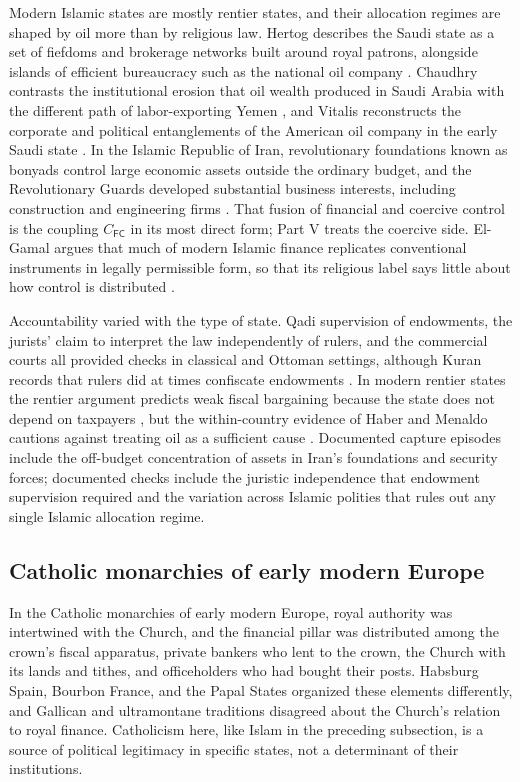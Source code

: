 \documentclass[11pt,letterpaper]{article}
\theoremstyle{definition}
\theoremstyle{remark}
\newcommand{\pF}{\mathsf{F}}
\newcommand{\pC}{\mathsf{C}}
\begin{document}
Modern Islamic states are mostly rentier states, and their allocation regimes are shaped by oil more than by religious law. Hertog describes the Saudi state as a set of fiefdoms and brokerage networks built around royal patrons, alongside islands of efficient bureaucracy such as the national oil company \citep{hertog2010}. Chaudhry contrasts the institutional erosion that oil wealth produced in Saudi Arabia with the different path of labor-exporting Yemen \citep{chaudhry1997}, and Vitalis reconstructs the corporate and political entanglements of the American oil company in the early Saudi state \citep{vitalis2007}. In the Islamic Republic of Iran, revolutionary foundations known as bonyads control large economic assets outside the ordinary budget, and the Revolutionary Guards developed substantial business interests, including construction and engineering firms \citep{maloney2015,wehrey2009}. That fusion of financial and coercive control is the coupling $C_{\pF\pC}$ in its most direct form; Part V treats the coercive side. El-Gamal argues that much of modern Islamic finance replicates conventional instruments in legally permissible form, so that its religious label says little about how control is distributed \citep{elgamal2006}.

Accountability varied with the type of state. Qadi supervision of endowments, the jurists' claim to interpret the law independently of rulers, and the commercial courts all provided checks in classical and Ottoman settings, although Kuran records that rulers did at times confiscate endowments \citep{kuran2001}. In modern rentier states the rentier argument predicts weak fiscal bargaining because the state does not depend on taxpayers \citep{beblawiluciani1987,ross2001}, but the within-country evidence of Haber and Menaldo cautions against treating oil as a sufficient cause \citep{habermenaldo2011}. Documented capture episodes include the off-budget concentration of assets in Iran's foundations and security forces; documented checks include the juristic independence that endowment supervision required and the variation across Islamic polities that rules out any single Islamic allocation regime.

\subsection{Catholic monarchies of early modern Europe}

In the Catholic monarchies of early modern Europe, royal authority was intertwined with the Church, and the financial pillar was distributed among the crown's fiscal apparatus, private bankers who lent to the crown, the Church with its lands and tithes, and officeholders who had bought their posts. Habsburg Spain, Bourbon France, and the Papal States organized these elements differently, and Gallican and ultramontane traditions disagreed about the Church's relation to royal finance. Catholicism here, like Islam in the preceding subsection, is a source of political legitimacy in specific states, not a determinant of their institutions.
\end{document}
